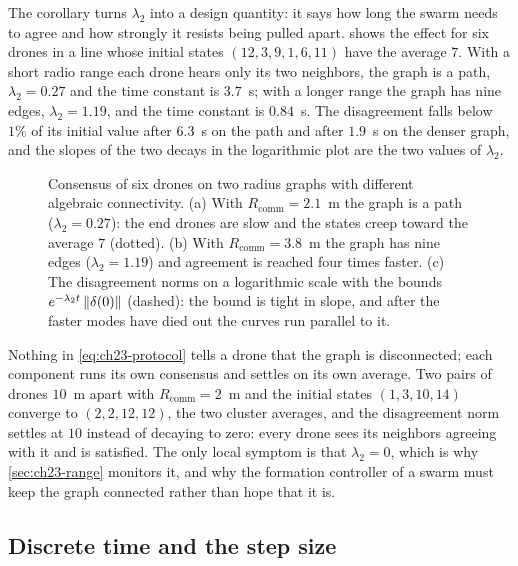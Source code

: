 The corollary turns $\lambda_2$ into a design quantity: it says how long the
swarm needs to agree and how strongly it resists being pulled apart.
 shows the effect for six drones in a line whose
initial states $(12, 3, 9, 1, 6, 11)$ have the average $7$. With a short radio
range each drone hears only its two neighbors, the graph is a path,
$\lambda_2 = 0.27$ and the time constant is $3.7$~s; with a longer range the
graph has nine edges, $\lambda_2 = 1.19$, and the time constant is $0.84$~s.
The disagreement falls below $1\%$ of its initial value after $6.3$~s on the
path and after $1.9$~s on the denser graph, and the slopes of the two decays in
the logarithmic plot are the two values of $\lambda_2$.

\begin{figure}[tb]
  \centering
  \caption{Consensus of six drones on two radius graphs with different
  algebraic connectivity. (a) With $R_{\mathrm{comm}} = 2.1$~m the graph is a
  path ($\lambda_2 = 0.27$): the end drones are slow and the states creep
  toward the average $7$ (dotted). (b) With $R_{\mathrm{comm}} = 3.8$~m the
  graph has nine edges ($\lambda_2 = 1.19$) and agreement is reached four times
  faster. (c) The disagreement norms on a logarithmic scale with the bounds
  $e^{-\lambda_2 t}\left\lVert \mathbf{\delta}(0) \right\rVert$ (dashed): the bound is tight in
  slope, and after the faster modes have died out the curves run parallel to
  it.}
  \label{fig:ch23-consensus}
\end{figure}

\begin{pitfall}
Nothing in \cref{eq:ch23-protocol} tells a drone that the graph is
disconnected; each component runs its own consensus and settles on its own
average. Two pairs of drones $10$~m apart with $R_{\mathrm{comm}} = 2$~m and
the initial states $(1, 3, 10, 14)$ converge to $(2, 2, 12, 12)$, the two
cluster averages, and the disagreement norm settles at $10$ instead of decaying
to zero: every
drone sees its neighbors agreeing with it and is satisfied. The only local
symptom is that $\lambda_2 = 0$, which is why \cref{sec:ch23-range} monitors
it, and why the formation controller of a swarm must keep the graph connected
rather than hope that it is.
\end{pitfall}

\subsection{Discrete time and the step size}

